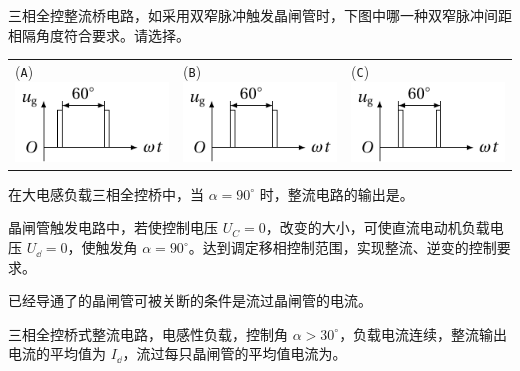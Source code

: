 \documentclass[电力电子]{subfiles}
\begin{document}
\begin{ti}
	三相全控整流桥电路，如采用双窄脉冲触发晶闸管时，下图中哪一种双窄脉冲间距相隔角度符合要求。请选择。
	\\\begin{tabular}{*{3}{@{}p{5.593cm}}}(\texttt{A})~\includegraphics{figure/fig1.pdf} & (\texttt{B})~\includegraphics{figure/fig2.pdf} & (\texttt{C})~\includegraphics{figure/fig3.pdf} \end{tabular}
\end{ti}

\begin{ti}
	在大电感负载三相全控桥中，当 $\alpha = 90^\circ$ 时，整流电路的输出是。
\end{ti}

\begin{ti}
	晶闸管触发电路中，若使控制电压 $U_{C} = 0$，改变的大小，可使直流电动机负载电压 $U_{\dd} = 0$，使触发角 $\alpha = 90^\circ$。达到调定移相控制范围，实现整流、逆变的控制要求。
\end{ti}

\begin{ti}
	已经导通了的晶闸管可被关断的条件是流过晶闸管的电流。
\end{ti}

\begin{ti}
	三相全控桥式整流电路，电感性负载，控制角 $\alpha > 30^\circ$，负载电流连续，整流输出电流的平均值为 $I_{\dd}$，流过每只晶闸管的平均值电流为。
\end{ti}
\end{document}
